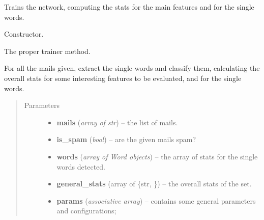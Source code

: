 \documentclass[letterpaper,10pt,english]{sphinxmanual}
\begin{document}
\begin{fulllineitems}
\label{index:trainer.Trainer}
Trains the network, computing the stats for the main features
and for the single words.

\begin{fulllineitems}
\label{index:trainer.Trainer.__init__}
Constructor.

\end{fulllineitems}


\begin{fulllineitems}
\label{index:trainer.Trainer.train}
The proper trainer method.

For all the mails given, extract the single words and classify them,
calculating the overall stats for some interesting features to be
evaluated, and for the single words.
\begin{quote}\begin{description}
\item[{Parameters}] \leavevmode\begin{itemize}
\item {} 
\textbf{mails} (\emph{array of str}) -- the list of mails.

\item {} 
\textbf{is\_spam} (\emph{bool}) -- are the given mails spam?

\item {} 
\textbf{words} (\emph{array of Word objects}) -- the array of stats for the single words detected.

\item {} 
\textbf{general\_stats} (array of \{str, {\hyperref[index:gen_stat.Stat]{}}\}) -- the overall stats of the set.

\item {} 
\textbf{params} (\emph{associative array}) -- contains some general parameters and configurations;

\end{itemize}

\end{description}\end{quote}


\end{fulllineitems}
\end{fulllineitems}
\end{document}
